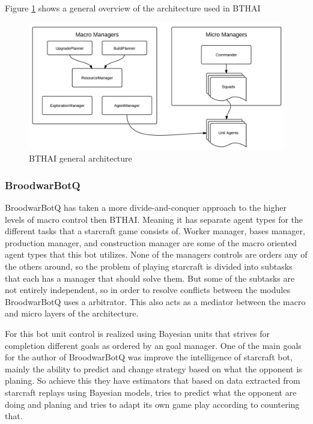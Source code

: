 Figure \ref{fig:bthaiarch} shows a general overview of the architecture used in BTHAI


\begin{figure}[h!tbp]
\centering
\includegraphics[scale=0.8]{graphics/bthai.png}
\caption{BTHAI general architecture}
\label{fig:bthaiarch}
\end{figure}

\subsubsection{BroodwarBotQ}
BroodwarBotQ has taken a more divide-and-conquer approach to the higher levels of macro control then BTHAI. Meaning it has separate agent types for the different tasks that a starcraft game consists of. Worker manager, bases manager, production manager, and construction manager are some of the macro oriented agent types that this bot utilizes. None of the managers controls are orders any of the others around, so the problem of playing starcraft is divided into subtasks that each has a manager that should solve them. But some of the subtasks are not entirely independent, so in order to resolve conflicts between the modules BroodwarBotQ uses a arbitrator. This also acts as a mediator between the macro and micro layers of the architecture. 

For this bot unit control is realized using Bayesian units that strives for completion different goals as ordered by an goal manager.\cite{synnaeve2011bayesian} One of the main goals for the author of BroodwarBotQ was improve the intelligence of starcraft bot, mainly the ability to predict and change strategy based on what the opponent is planing. So achieve this they have estimators that based on data extracted from starcraft replays using Bayesian models, tries to predict what the opponent are doing and planing and tries to adapt its own game play according to countering that. 

